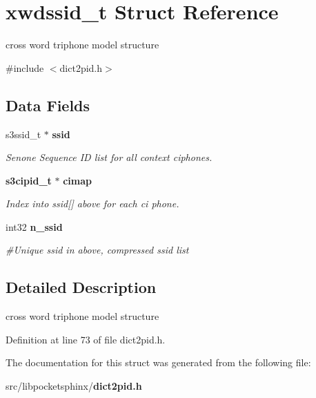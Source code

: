 \section{xwdssid\-\_\-t Struct Reference}
\label{structxwdssid__t}


cross word triphone model structure  




{\ttfamily \#include $<$dict2pid.\-h$>$}

\subsection*{Data Fields}
\begin{DoxyCompactItemize}
\item 
s3ssid\-\_\-t $\ast$ {\bf ssid}\label{structxwdssid__t_adbeeda6e94a51f08626c13414cdad6a8}

\begin{DoxyCompactList}\small\item\em Senone Sequence I\-D list for all context ciphones. \end{DoxyCompactList}\item 
{\bf s3cipid\-\_\-t} $\ast$ {\bf cimap}\label{structxwdssid__t_a502f9241a70383aa260d3390e4ff58fb}

\begin{DoxyCompactList}\small\item\em Index into ssid[] above for each ci phone. \end{DoxyCompactList}\item 
int32 {\bf n\-\_\-ssid}\label{structxwdssid__t_ab4443c642c5aff57c35abed070112d6e}

\begin{DoxyCompactList}\small\item\em \#\-Unique ssid in above, compressed ssid list \end{DoxyCompactList}\end{DoxyCompactItemize}


\subsection{Detailed Description}
cross word triphone model structure 

Definition at line 73 of file dict2pid.\-h.



The documentation for this struct was generated from the following file\-:\begin{DoxyCompactItemize}
\item 
src/libpocketsphinx/{\bf dict2pid.\-h}\end{DoxyCompactItemize}
